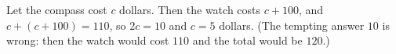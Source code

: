 Let the compass cost $c$ dollars. Then the watch costs $c+100$, and $c+(c+100)=110$, so $2c=10$ and $c=\boxed{5}$ dollars. (The tempting answer $10$ is wrong: then the watch would cost $110$ and the total would be $120$.)
